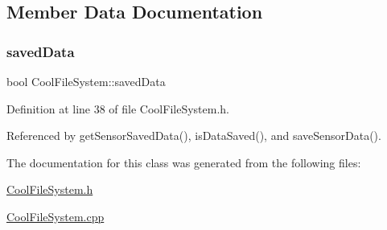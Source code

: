 \subsection{Member Data Documentation}
\mbox{\label{classCoolFileSystem_ad398e0c5c41a0c88acdf5d672aa71351}} 
\subsubsection{\texorpdfstring{saved\+Data}{savedData}}
{\footnotesize\ttfamily bool Cool\+File\+System\+::saved\+Data\hspace{0.3cm}{\ttfamily [private]}}



Definition at line 38 of file Cool\+File\+System.\+h.



Referenced by get\+Sensor\+Saved\+Data(), is\+Data\+Saved(), and save\+Sensor\+Data().



The documentation for this class was generated from the following files\+:\begin{DoxyCompactItemize}
\item 
\hyperlink{CoolFileSystem_8h}{Cool\+File\+System.\+h}\item 
\hyperlink{CoolFileSystem_8cpp}{Cool\+File\+System.\+cpp}\end{DoxyCompactItemize}
